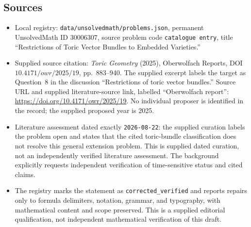 \documentclass[11pt]{article}
\begin{document}
\subsection{Sources}
\begin{itemize}
\item Local registry: \texttt{data/unsolvedmath/problems.json}, permanent UnsolvedMath ID \(30006307\), source problem code \texttt{catalogue entry}, title ``Restrictions of Toric Vector Bundles to Embedded Varieties.''
\item Supplied source citation: \emph{Toric Geometry} (2025), Oberwolfach Reports, DOI \(10.4171/owr/2025/19\), pp.~883--940. The supplied excerpt labels the target as Question~8 in the discussion ``Restrictions of toric vector bundles.'' Source URL and supplied literature-source link, labelled ``Oberwolfach report'': \url{https://doi.org/10.4171/owr/2025/19}. No individual proposer is identified in the record; the supplied proposed year is 2025.
\item Literature assessment dated exactly \texttt{2026-08-22}: the supplied curation labels the problem open and states that the cited toric-bundle classification does not resolve this general extension problem. This is supplied dated curation, not an independently verified literature assessment. The background explicitly requests independent verification of time-sensitive status and cited claims.
\item The registry marks the statement as \texttt{corrected\_verified} and reports repairs only to formula delimiters, notation, grammar, and typography, with mathematical content and scope preserved. This is a supplied editorial qualification, not independent mathematical verification of this draft.
\end{itemize}
\end{document}
